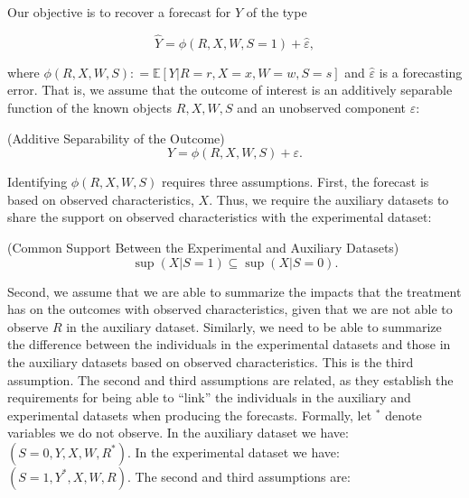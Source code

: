 \noindent Our objective is to recover a forecast for $Y$ of the type

\begin{equation}
\widehat{Y} = \widehat{\phi} \left( R, X, W, S = 1 \right) + \widehat{\varepsilon},   \label{eq:additive}
\end{equation}

\noindent where $\phi \left( R, X, W, S \right) : = \mathbb{E} \left[ Y | R = r, X = x, W = w, S = s \right] $ and $\widehat{\varepsilon}$ is a forecasting error. That is, we assume that the outcome of interest is an additively separable function of the known objects $R, X, W, S$ and an unobserved component $\varepsilon$: 

\begin{assumption} (Additive Separability of the Outcome) \label{ass:additive}
\begin{equation}
Y = \phi \left( R, X, W, S \right) + \varepsilon. 
\end{equation}
\end{assumption}

\noindent Identifying $\phi \left( R, X, W, S \right)$ requires three assumptions. First, the forecast is based on observed characteristics, $X$. Thus, we require the auxiliary datasets to share the support on observed characteristics with the experimental dataset: 

\begin{assumption} \label{ass:support} (Common Support Between the Experimental and Auxiliary Datasets)
\begin{equation}
\sup \left( X | S = 1 \right) \subseteq \sup \left( X | S = 0 \right).
\end{equation}
\end{assumption}

\noindent Second, we assume that we are able to summarize the impacts that the treatment has on the outcomes with observed characteristics, given that we are not able to observe $R$ in the auxiliary dataset. Similarly, we need to be able to summarize the difference between the individuals in the experimental datasets and those in the auxiliary datasets based on observed characteristics. This is the third assumption. The second and third  assumptions are related, as they establish the requirements for being able to ``link'' the individuals in the auxiliary and experimental datasets when producing the forecasts. Formally, let $^{*}$ denote variables we do not observe. In the auxiliary dataset we have: $\left( S = 0, Y, X, W, R^* \right)$. In the experimental dataset we have: $\left( S = 1, Y^*, X, W, R \right)$. The second and third assumptions are:  


